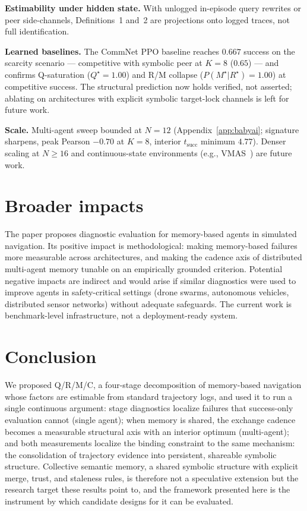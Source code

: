 \documentclass{article}
\begin{document}
\textbf{Estimability under hidden state.} With unlogged in-episode query rewrites or peer side-channels, Definitions~1 and~2 are projections onto logged traces, not full identification.

\textbf{Learned baselines.} The CommNet PPO baseline reaches $0.667$ success on the scarcity scenario --- competitive with symbolic peer at $K{=}8$ ($0.65$) --- and confirms Q-saturation ($Q^\star{=}1.00$) and R/M collapse ($P(M^\star|R^\star){=}1.00$) at competitive success. The structural prediction now holds verified, not asserted; ablating on architectures with explicit symbolic target-lock channels is left for future work.

\textbf{Scale.} Multi-agent sweep bounded at $N{=}12$ (Appendix~\ref{app:babyai}; signature sharpens, peak Pearson $-0.70$ at $K{=}8$, interior $t_{\mathrm{succ}}$ minimum $4.77$). Denser scaling at $N{\ge}16$ and continuous-state environments (e.g., VMAS~\citep{bettini2022vmas}) are future work.

\section{Broader impacts}

The paper proposes diagnostic evaluation for memory-based agents in simulated navigation. Its positive impact is methodological: making memory-based failures more measurable across architectures, and making the cadence axis of distributed multi-agent memory tunable on an empirically grounded criterion. Potential negative impacts are indirect and would arise if similar diagnostics were used to improve agents in safety-critical settings (drone swarms, autonomous vehicles, distributed sensor networks) without adequate safeguards. The current work is benchmark-level infrastructure, not a deployment-ready system.

\section{Conclusion}

We proposed Q/R/M/C, a four-stage decomposition of memory-based
navigation whose factors are estimable from standard trajectory logs,
and used it to run a single continuous argument: stage diagnostics
localize failures that success-only evaluation cannot (single agent);
when memory is shared, the exchange cadence becomes a measurable
structural axis with an interior optimum (multi-agent); and both
measurements localize the binding constraint to the same mechanism:
the consolidation of trajectory evidence into persistent, shareable
symbolic structure. Collective semantic memory, a shared symbolic
structure with explicit merge, trust, and staleness rules, is
therefore not a speculative extension but the research target these
results point to, and the framework presented here is the instrument by
which candidate designs for it can be evaluated.
\end{document}
